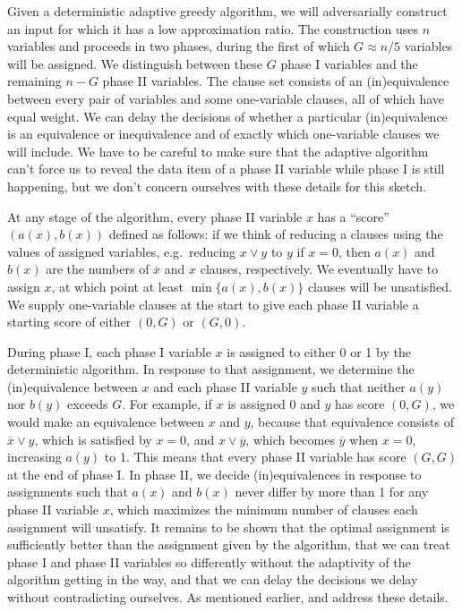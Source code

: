 \documentclass[11pt,letter]{article}
\numberwithin{theorem}{section}
\newcommand{\ol}{\overline}
\begin{document}
Given a deterministic adaptive greedy algorithm,
we will adversarially construct an input for which it has
a low approximation ratio.
The construction uses $n$ variables and proceeds in two phases,
during the first of which $G \approx n/5$ variables will be assigned.
We distinguish between these $G$ phase I variables
and the remaining $n-G$ phase II variables.
The clause set consists of an (in)equivalence between every pair of variables
and some one-variable clauses,
all of which have equal weight.
We can delay the decisions of whether a particular (in)equivalence
is an equivalence or inequivalence
and of exactly which one-variable clauses we will include.
We have to be careful to make sure that
the adaptive algorithm can't force us to reveal the data item
of a phase II variable while phase I is still happening,
but we don't concern ourselves with these details for this sketch.

At any stage of the algorithm, every phase II variable $x$
has a ``score'' $(a(x),b(x))$
defined as follows:
if we think of reducing a clauses using the values of assigned variables,
e.g.\ reducing $x \lor y$ to $y$ if $x = 0$,
then $a(x)$ and $b(x)$ are
the numbers of $\ol{x}$ and $x$ clauses, respectively.
We eventually have to assign $x$,
at which point at least $\min\{a(x),b(x)\}$ clauses will be unsatisfied.
We supply one-variable clauses at the start to give each phase II variable
a starting score of either $(0,G)$ or $(G,0)$.

During phase I,
each phase I variable $x$ is assigned to either 0 or 1
by the deterministic algorithm.
In response to that assignment,
we determine the (in)equivalence between $x$ and each phase II variable $y$
such that neither $a(y)$ nor $b(y)$ exceeds $G$.
For example, if $x$ is assigned 0 and $y$ has score $(0,G)$,
we would make an equivalence between $x$ and $y$,
because that equivalence consists of $\ol{x} \lor y$,
which is satisfied by $x = 0$,
and $x \lor \ol{y}$, which becomes $\ol{y}$ when $x = 0$,
increasing $a(y)$ to 1.
This means that every phase II variable has score $(G,G)$
at the end of phase I.
In phase II, we decide (in)equivalences in response to assignments
such that $a(x)$ and $b(x)$ never differ by more than 1
for any phase II variable $x$,
which maximizes the minimum number of clauses
each assignment will unsatisfy.
It remains to be shown that the optimal assignment
is sufficiently better than the assignment given by the algorithm,
that we can treat phase I and phase II variables so differently
without the adaptivity of the algorithm getting in the way,
and that we can delay the decisions we delay without contradicting ourselves.
As mentioned earlier,
\cite{PoloczekVideo} and \cite{DBLP:conf/esa/Poloczek11}
address these details.




\end{document}
